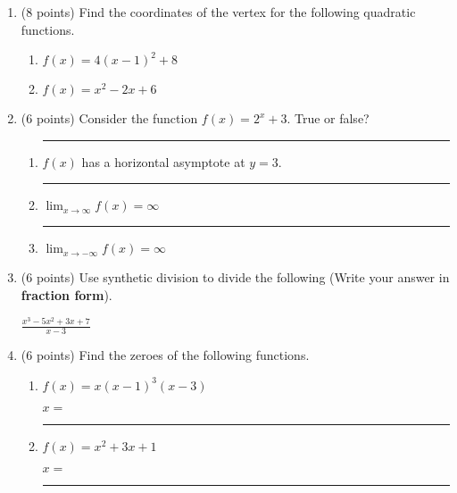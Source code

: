 \documentclass[11pt]{article}
\begin{document}
\begin{enumerate}
\item (8 points) Find the coordinates of the vertex for the following quadratic functions.
\begin{enumerate}[itemsep=40pt]
    \item $f(x) = 4(x-1)^2 + 8$
    \item $f(x) = x^2 - 2x + 6$ \\
\end{enumerate}
\vspace{100pt}

\item (6 points) Consider the function $f(x) = 2^x + 3$. True or false?
\begin{enumerate}[itemsep=20pt]
    \item \rule{1cm}{0.4pt} $f(x)$ has a horizontal asymptote at $y=3$.
    \item \rule{1cm}{0.4pt} $\displaystyle{\lim_{x \to \infty} f(x) = \infty}$
    \item \rule{1cm}{0.4pt} $\displaystyle{\lim_{x \to -\infty} f(x) = \infty}$
\end{enumerate}
\vspace{20pt}


\newpage




\item (6 points) Use synthetic division to divide the following (Write your answer in \textbf{fraction form}).

\vspace{10pt}
$\displaystyle{\frac{x^3 - 5x^2 + 3x + 7}{x-3}} $
\vspace{100pt}

\item (6 points) Find the zeroes of the following functions. 
\begin{enumerate}[itemsep=10pt]
    \item $f(x) = x(x-1)^{3}(x-3)$
    \vspace{60pt}
    \begin{flushright}
    $x=$ \rule{4cm}{0.4pt}
    \end{flushright}
    
    \item $f(x) = x^2 + 3x + 1$
    \vspace{60pt}
    \begin{flushright}
    $x=$ \rule{4cm}{0.4pt}
    \end{flushright}
\end{enumerate}
\vspace{10pt}


\end{enumerate}
\end{document}
